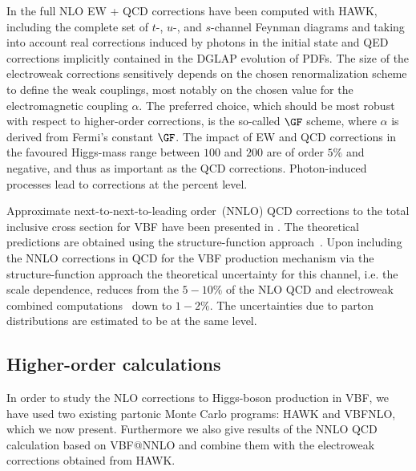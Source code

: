 In  the full NLO EW +
QCD corrections have been computed with {\sc HAWK}, including the complete set of
$t$-, $u$-, and $s$-channel Feynman diagrams and taking into account
real corrections induced by photons in the initial state and QED
corrections implicitly contained in the DGLAP evolution of PDFs.  The
size of the electroweak corrections sensitively depends on the chosen
renormalization scheme to define the weak couplings, most notably on
the chosen value for the electromagnetic coupling $\alpha$. The
preferred choice, which should be most robust with respect to
higher-order corrections, is the so-called $\GF$ scheme, where
$\alpha$ is derived from Fermi's constant $\GF$.  The impact of EW and
QCD corrections in the favoured Higgs-mass range between $100$ and
$200$\UGeV{} are of order $5\%$ and negative, and thus as important as
the QCD corrections.  Photon-induced processes lead to corrections at
the percent level.

Approximate next-to-next-to-leading order~(NNLO) QCD corrections to the total
inclusive cross section for VBF have been presented in .
The theoretical predictions are obtained using the structure-function
approach~\cite{Han:1992hr}. Upon including the NNLO corrections in QCD for
the VBF production mechanism via the structure-function approach the
theoretical uncertainty for this channel, i.e. the scale dependence, reduces from the $5{-}10\%$ of the
NLO QCD and electroweak combined
computations~\cite{Han:1992hr,Ciccolini:2007ec} down to $1{-}2\%$. The
uncertainties due to parton distributions are estimated to be at the same
level.




\subsection{Higher-order calculations}
\label{sec:NLO_calculations}
In order to study the NLO corrections to Higgs-boson production in VBF, we
have used two existing partonic Monte Carlo programs: {\sc HAWK} and {\sc
  VBFNLO}, which we now present. Furthermore we also give results of the
NNLO QCD calculation based on {\sc VBF@NNLO} and combine them with the
electroweak corrections obtained from {\sc HAWK}.

